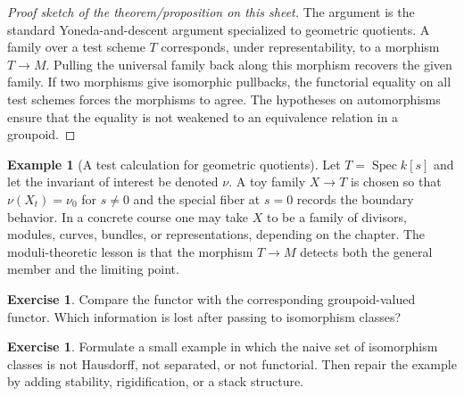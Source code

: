 \documentclass[11pt]{amsart}
\theoremstyle{definition}
\newtheorem{example}[theorem]{Example}
\newtheorem{exercise}[theorem]{Exercise}
\newcommand{\Spec}{\operatorname{Spec}}
\begin{document}
\begin{proof}[Proof sketch of the theorem/proposition on this sheet]
The argument is the standard Yoneda-and-descent argument specialized to geometric quotients.  A family over a test scheme $T$ corresponds, under representability, to a morphism $T\to M$.  Pulling the universal family back along this morphism recovers the given family.  If two morphisms give isomorphic pullbacks, the functorial equality on all test schemes forces the morphisms to agree.  The hypotheses on automorphisms ensure that the equality is not weakened to an equivalence relation in a groupoid.
\end{proof}
\begin{example}[A test calculation for geometric quotients]
Let $T=\Spec k[s]$ and let the invariant of interest be denoted $\nu$.  A toy family $X\to T$ is chosen so that $\nu(X_t)=\nu_0$ for $s\ne0$ and the special fiber at $s=0$ records the boundary behavior.  In a concrete course one may take $X$ to be a family of divisors, modules, curves, bundles, or representations, depending on the chapter.  The moduli-theoretic lesson is that the morphism $T\to M$ detects both the general member and the limiting point.
\end{example}
\begin{exercise}
Compare the functor with the corresponding groupoid-valued functor.  Which information is lost after passing to isomorphism classes?
\end{exercise}
\begin{exercise}
Formulate a small example in which the naive set of isomorphism classes is not Hausdorff, not separated, or not functorial.  Then repair the example by adding stability, rigidification, or a stack structure.
\end{exercise}
\clearpage
\end{document}
